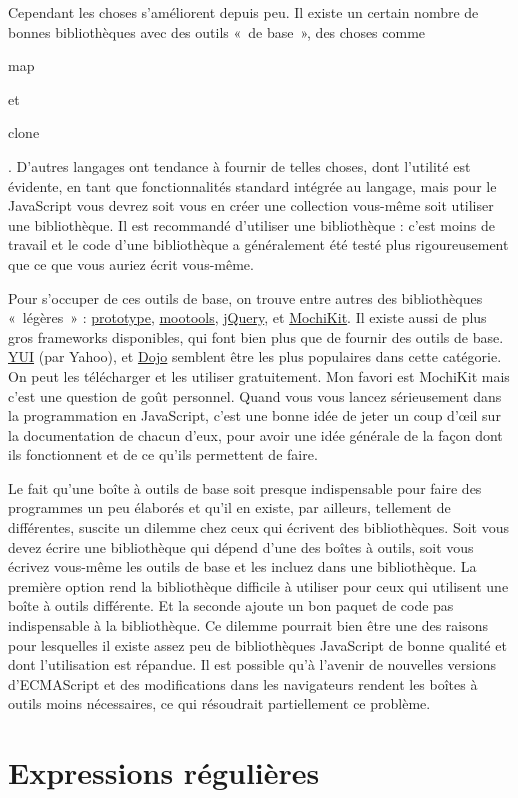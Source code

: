 \documentclass{FramateX}
\renewcommand{\texttt}[1]{\begin{sffamily}{#1}\end{sffamily}}
\begin{document}
Cependant les choses s'améliorent depuis peu. Il existe un certain
nombre de bonnes bibliothèques avec des outils «~de base~», des choses
comme \texttt{map} et \texttt{clone}. D'autres langages ont tendance à
fournir de telles choses, dont l'utilité est évidente, en tant que
fonctionnalités standard intégrée au langage, mais pour le JavaScript
vous devrez soit vous en créer une collection vous-même soit utiliser
une bibliothèque. Il est recommandé d'utiliser une bibliothèque : c'est
moins de travail et le code d'une bibliothèque a généralement été testé
plus rigoureusement que ce que vous auriez écrit vous-même.

Pour s'occuper de ces outils de base, on trouve entre autres des
bibliothèques «~légères~» :
\href{http://www.prototypejs.org/}{prototype},
\href{http://mootools.net}{mootools}, \href{http://jquery.com}{jQuery},
et \href{http://mochikit.com}{MochiKit}. Il existe aussi de plus gros
frameworks disponibles, qui font bien plus que de fournir des outils de
base. \href{http://developer.yahoo.com/yui/}{YUI} (par Yahoo), et
\href{http://dojotoolkit.org/}{Dojo} semblent être les plus populaires
dans cette catégorie. On peut les télécharger et les utiliser
gratuitement. Mon favori est MochiKit mais c'est une question de goût
personnel. Quand vous vous lancez sérieusement dans la programmation en
JavaScript, c'est une bonne idée de jeter un coup d'œil sur la
documentation de chacun d'eux, pour avoir une idée générale de la façon
dont ils fonctionnent et de ce qu'ils permettent de faire.

Le fait qu'une boîte à outils de base soit presque indispensable pour
faire des programmes un peu élaborés et qu'il en existe, par ailleurs,
tellement de différentes, suscite un dilemme chez ceux qui écrivent des
bibliothèques. Soit vous devez écrire une bibliothèque qui dépend d'une
des boîtes à outils, soit vous écrivez vous-même les outils de base et
les incluez dans une bibliothèque. La première option rend la
bibliothèque difficile à utiliser pour ceux qui utilisent une boîte à
outils différente. Et la seconde ajoute un bon paquet de code pas
indispensable à la bibliothèque. Ce dilemme pourrait bien être une des
raisons pour lesquelles il existe assez peu de bibliothèques JavaScript
de bonne qualité et dont l'utilisation est répandue. Il est possible
qu'à l'avenir de nouvelles versions d'ECMAScript et des modifications
dans les navigateurs rendent les boîtes à outils moins nécessaires, ce
qui résoudrait partiellement ce problème.

\chapter{Expressions régulières}
\end{document}
